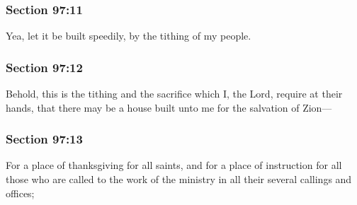 
	\subsubsection{Section 97:11} %
		\label{DC97-11}

		Yea, let it be built speedily, by the tithing of my people.


	\subsubsection{Section 97:12} %
		\label{DC97-12}

		Behold, this is the tithing and the sacrifice which I, the Lord, require at their hands, that there may be a house built unto me for the salvation of Zion---


	\subsubsection{Section 97:13} %
		\label{DC97-13}

		For a place of thanksgiving for all saints, and for a place of instruction for all those who are called to the work of the ministry in all their several callings and offices;

